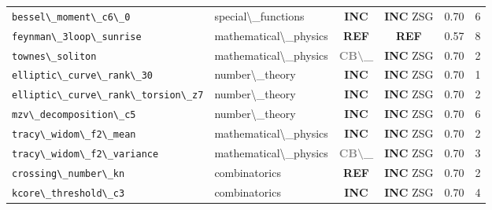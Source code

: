 \documentclass[12pt,a4paper]{article}
\begin{document}
\begin{longtable}{llcccc}
  \texttt{bessel\textbackslash{}_moment\textbackslash{}_c6\textbackslash{}_0} & special\textbackslash{}_functions & \textcolor{incompleteamber}{\textbf{INC}} & \textcolor{incompleteamber}{\textbf{INC}}  \textcolor{sorryred}{ZSG} & 0.70 & 6 \\
  \texttt{feynman\textbackslash{}_3loop\textbackslash{}_sunrise} & mathematical\textbackslash{}_physics & \textcolor{refutedred}{\textbf{REF}} & \textcolor{refutedred}{\textbf{REF}}  & 0.57 & 8 \\
  \texttt{townes\textbackslash{}_soliton} & mathematical\textbackslash{}_physics & \textcolor{gray}{\textbf{CB\textbackslash{}_}} & \textcolor{incompleteamber}{\textbf{INC}}  \textcolor{sorryred}{ZSG} & 0.70 & 2 \\
  \texttt{elliptic\textbackslash{}_curve\textbackslash{}_rank\textbackslash{}_30} & number\textbackslash{}_theory & \textcolor{incompleteamber}{\textbf{INC}} & \textcolor{incompleteamber}{\textbf{INC}}  \textcolor{sorryred}{ZSG} & 0.70 & 1 \\
  \texttt{elliptic\textbackslash{}_curve\textbackslash{}_rank\textbackslash{}_torsion\textbackslash{}_z7} & number\textbackslash{}_theory & \textcolor{incompleteamber}{\textbf{INC}} & \textcolor{incompleteamber}{\textbf{INC}}  \textcolor{sorryred}{ZSG} & 0.70 & 2 \\
  \texttt{mzv\textbackslash{}_decomposition\textbackslash{}_c5} & number\textbackslash{}_theory & \textcolor{incompleteamber}{\textbf{INC}} & \textcolor{incompleteamber}{\textbf{INC}}  \textcolor{sorryred}{ZSG} & 0.70 & 6 \\
  \texttt{tracy\textbackslash{}_widom\textbackslash{}_f2\textbackslash{}_mean} & mathematical\textbackslash{}_physics & \textcolor{incompleteamber}{\textbf{INC}} & \textcolor{incompleteamber}{\textbf{INC}}  \textcolor{sorryred}{ZSG} & 0.70 & 2 \\
  \texttt{tracy\textbackslash{}_widom\textbackslash{}_f2\textbackslash{}_variance} & mathematical\textbackslash{}_physics & \textcolor{gray}{\textbf{CB\textbackslash{}_}} & \textcolor{incompleteamber}{\textbf{INC}}  \textcolor{sorryred}{ZSG} & 0.70 & 3 \\
  \texttt{crossing\textbackslash{}_number\textbackslash{}_kn} & combinatorics & \textcolor{refutedred}{\textbf{REF}} & \textcolor{incompleteamber}{\textbf{INC}}  \textcolor{sorryred}{ZSG} & 0.70 & 2 \\
  \texttt{kcore\textbackslash{}_threshold\textbackslash{}_c3} & combinatorics & \textcolor{incompleteamber}{\textbf{INC}} & \textcolor{incompleteamber}{\textbf{INC}}  \textcolor{sorryred}{ZSG} & 0.70 & 4 \\

\end{longtable}
\end{document}
